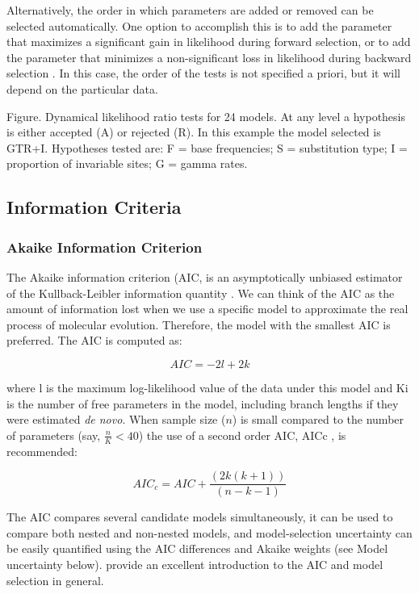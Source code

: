 \documentclass[11pt,twoside,a4paper]{article}
\begin{document}
Alternatively, the order in which parameters are added or removed can be selected automatically. One option to accomplish this is to add the parameter that maximizes a significant gain in likelihood during forward selection, or to add the parameter that minimizes a non-significant loss in likelihood during backward selection \citep{Posada-2001a}. In this case, the order of the tests is not specified a priori, but it will depend on the particular data.


Figure. Dynamical likelihood ratio tests for 24 models. At any level a hypothesis is either accepted (A) or rejected (R). In this example the model selected is GTR+I. Hypotheses tested are: F = base frequencies; S = substitution type; I = proportion of invariable sites; G = gamma rates.

\subsection{Information Criteria}
\subsubsection{Akaike Information Criterion}

The Akaike information criterion (AIC, \citep{Akaike-1974} is an asymptotically unbiased estimator of the Kullback-Leibler information quantity \citep{Kullback-1951}. We can think of the AIC as the amount of information lost when we use a specific model to approximate the real process of molecular evolution. Therefore, the model with the smallest AIC is preferred. The AIC is computed as:

\[
AIC=-2l+2k
\]

where l is the maximum log-likelihood value of the data under this model and Ki is the number of free parameters in the model, including branch lengths if they were estimated \emph{de novo}. When sample size ($n$) is small compared to the number of parameters (say, $\frac{n}{K} < 40$) the use of a second order AIC, AICc \citep{Sugiura-1978, Hurvich-1989}, is recommended:

\[
AIC_c=AIC+\frac{(2k(k+1))}{(n-k-1)}
\]

The AIC compares several candidate models simultaneously, it can be used to compare both nested and non-nested models, and model-selection uncertainty can be easily quantified using the AIC differences and Akaike weights (see Model uncertainty below). \citet{Burnham-2003} provide an excellent introduction to the AIC and model selection in general.
\end{document}
